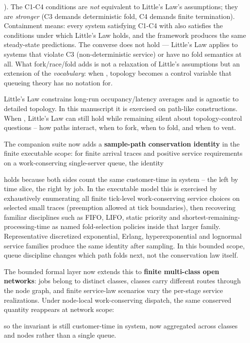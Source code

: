 \documentclass[
]{article}
\begin{document}
). The C1-C4 conditions are \emph{not} equivalent to Little's Law's
assumptions; they are \emph{stronger} (C3 demands deterministic fold, C4
demands finite termination). Containment means: every system satisfying
C1-C4 with also satisfies the conditions under which Little's Law holds,
and the framework produces the same steady-state predictions. The
converse does not hold --- Little's Law applies to systems that violate
C3 (non-deterministic service) or have no fold semantics at all. What
fork/race/fold adds is not a relaxation of Little's assumptions but an
extension of the \emph{vocabulary}: when , topology becomes a control
variable that queueing theory has no notation for.

Little's Law constrains long-run occupancy/latency averages and is
agnostic to detailed topology. In this manuscript it is exercised on
path-like constructions. When , Little's Law can still hold while
remaining silent about topology-control questions -- how paths interact,
when to fork, when to fold, and when to vent.

The companion suite now adds a \textbf{sample-path conservation
identity} in the finite executable scope: for finite arrival traces and
positive service requirements on a work-conserving single-server queue,
the identity

holds because both sides count the same customer-time in system -- the
left by time slice, the right by job. In the executable model this is
exercised by exhaustively enumerating all finite tick-level
work-conserving service choices on selected small traces (preemption
allowed at tick boundaries), then recovering familiar disciplines such
as FIFO, LIFO, static priority and shortest-remaining-processing-time as
named fold-selection policies inside that larger family. Representative
discretized exponential, Erlang, hyperexponential and lognormal service
families produce the same identity after sampling. In this bounded
scope, queue discipline changes which path folds next, not the
conservation law itself.

The bounded formal layer now extends this to \textbf{finite multi-class
open networks}: jobs belong to distinct classes, classes carry different
routes through the node graph, and finite service-law scenarios vary the
per-stage service realizations. Under node-local work-conserving
dispatch, the same conserved quantity reappears at network scope:

so the invariant is still customer-time in system, now aggregated across
classes and nodes rather than a single queue.
\end{document}

